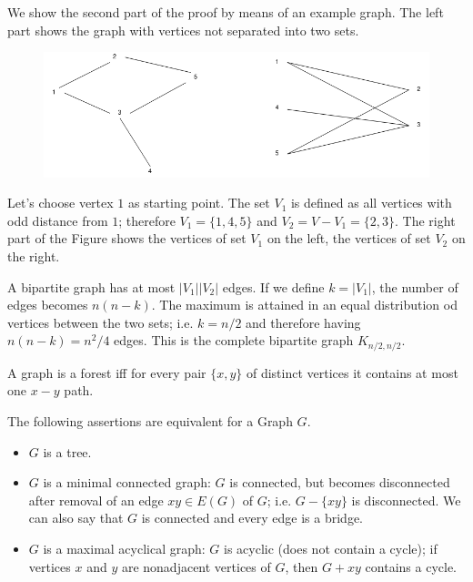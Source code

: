We show the second part of the proof by means of an example graph. The left part shows the graph with vertices not separated into two sets.

  \begin{figure}[H]
    \centering
    \includegraphics[scale=0.5]{images/graphs_03_05.png}
  \end{figure}

Let's choose vertex $1$ as starting point. The set $V_1$ is defined as all vertices with odd distance from $1$; therefore $V_1 = \{1, 4, 5\}$ and $V_2 = V - V_1 = \{2, 3\}$. The right part of the Figure shows the vertices of set $V_1$ on the left, the vertices of set $V_2$ on the right.

A bipartite graph has at most $|V_1| |V_2|$ edges. If we define $k = |V_1|$, the number of edges becomes $n(n-k)$. The maximum is attained in an equal distribution od vertices between the two sets; i.e. $k = n/2$ and therefore having $n(n-k) = n^2/4$ edges. This is the complete bipartite graph $K_{n/2, n/2}$.
  
\begin{theorem}
  A graph is a forest iff for every pair $\{x,y\}$ of distinct vertices it contains at most one $x-y$ path.
\end{theorem}

\begin{theorem}
  The following assertions are equivalent for a Graph $G$.
  \begin{itemize}
  \item $G$ is a tree.
  \item $G$ is a minimal connected graph: $G$ is connected, but becomes disconnected after removal of an edge $xy \in E(G)$ of $G$; i.e. $G - \{xy\}$ is disconnected. We can also say that $G$ is connected and every edge is a bridge.
  \item $G$ is a maximal acyclical graph: $G$ is acyclic (does not contain a cycle); if vertices $x$ and $y$ are nonadjacent vertices of $G$, then $G + xy$ contains a cycle.
  \end{itemize}
\end{theorem}


